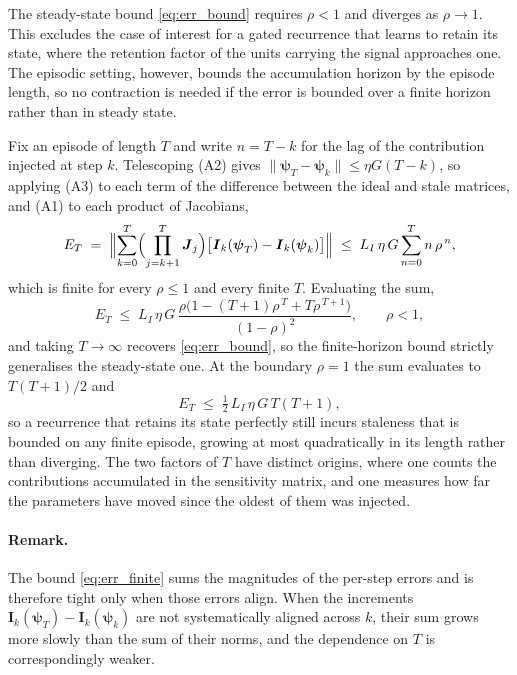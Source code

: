 \documentclass{article}
\begin{document}
The steady-state bound \eqref{eq:err_bound} requires $\rho < 1$ and diverges as
$\rho \to 1$. This excludes the case of interest for a gated recurrence that
learns to retain its state, where the retention factor of the units carrying the
signal approaches one. The episodic setting, however, bounds the accumulation
horizon by the episode length, so no contraction is needed if the error is
bounded over a finite horizon rather than in steady state.

Fix an episode of length $T$ and write $n = T - k$ for the lag of the
contribution injected at step $k$. Telescoping (A2) gives
$\|\boldsymbol{\psi}_T - \boldsymbol{\psi}_k\| \le \eta G (T-k)$, so applying (A3) to each
term of the difference between the ideal and stale matrices, and (A1) to each
product of Jacobians,
\begin{equation}
    E_T
    \;=\; \Bigl\| \sum_{k=0}^{T} \Bigl(\prod_{j=k+1}^{T} \boldsymbol{J}_j\Bigr)
      \bigl[\boldsymbol{I}_k(\boldsymbol{\psi}_T) - \boldsymbol{I}_k(\boldsymbol{\psi}_k)\bigr] \Bigr\|
    \;\le\; L_I\, \eta\, G \sum_{n=0}^{T} n\, \rho^{\,n},
    \label{eq:err_finite}
\end{equation}
which is finite for every $\rho \le 1$ and every finite $T$. Evaluating the sum,
\begin{equation}
    E_T \;\le\; L_I\, \eta\, G \,
    \frac{\rho\bigl(1 - (T+1)\rho^{\,T} + T \rho^{\,T+1}\bigr)}{(1-\rho)^2},
    \qquad \rho < 1,
\end{equation}
and taking $T \to \infty$ recovers \eqref{eq:err_bound}, so the finite-horizon
bound strictly generalises the steady-state one. At the boundary $\rho = 1$ the
sum evaluates to $T(T+1)/2$ and
\begin{equation}
    E_T \;\le\; \tfrac{1}{2}\, L_I\, \eta\, G\, T (T+1),
    \label{eq:err_rho_one}
\end{equation}
so a recurrence that retains its state perfectly still incurs staleness that is
bounded on any finite episode, growing at most quadratically in its length rather
than diverging. The two factors of $T$ have distinct origins, where one counts the
contributions accumulated in the sensitivity matrix, and one measures how far the
parameters have moved since the oldest of them was injected.

\paragraph{Remark.} The bound \eqref{eq:err_finite} sums the magnitudes of the
per-step errors and is therefore tight only when those errors align. When the
increments $\boldsymbol{I}_k(\boldsymbol{\psi}_T) - \boldsymbol{I}_k(\boldsymbol{\psi}_k)$ are
not systematically aligned across $k$, their sum grows more slowly than the sum
of their norms, and the dependence on $T$ is correspondingly weaker.
\end{document}
